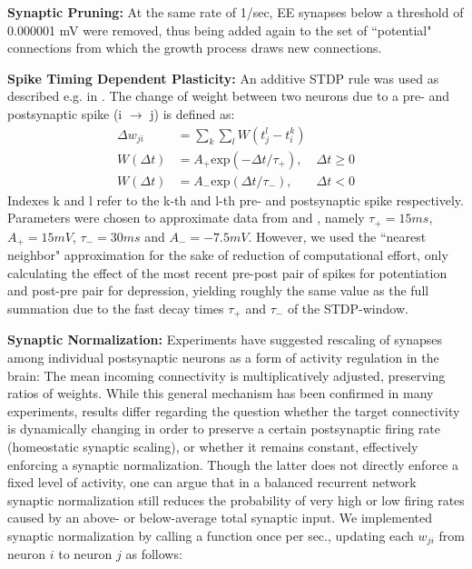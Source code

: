 \documentclass[10pt,a4paper]{article}
\begin{document}
\textbf{Synaptic Pruning:} At the same rate of 1/sec, EE synapses below a threshold of 0.000001 mV were removed, thus being added again to the set of ``potential" connections from which the growth process draws new connections.

\textbf{Spike Timing Dependent Plasticity:} An additive STDP rule was used as described e.g. in \cite{Zhang_STDP}. The change of weight between two neurons due to a pre- and postsynaptic spike (i $\rightarrow$ j) is defined as:
\begin{align}
\Delta w_{ji} &= \sum_k \sum_l W(t_j^l - t_i^k) \label{STDP_rule} \\
W(\Delta t) &= A_{+} \mathrm{exp}(-\Delta t / \tau_{+}), & \Delta t \geq 0 \label{STDP_pos} \\
W(\Delta t) &= A_{-} \mathrm{exp}(\Delta t / \tau_{-}), & \Delta t < 0 \label{STDP_neg}
\end{align}
Indexes k and l refer to the k-th and l-th pre- and postsynaptic spike respectively. Parameters were chosen to approximate data from \cite{Bi_Poo_STDP} and \cite{Froemke_STDP}, namely $\tau_{+} = 15 ms$, $A_{+} = 15 mV$, $\tau_{-} = 30 ms$ and $A_{-} = -7.5 mV$. However, we used the ``nearest neighbor" approximation for the sake of reduction of computational effort, only calculating the effect of the most recent pre-post pair of spikes for potentiation and post-pre pair for depression, yielding roughly the same value as the full summation due to the fast decay times $\tau_{+}$ and $\tau_{-}$ of the STDP-window.

\textbf{Synaptic Normalization:} Experiments have suggested rescaling of synapses among individual postsynaptic neurons as a form of activity regulation in the brain: The mean incoming connectivity is multiplicatively adjusted, preserving ratios of weights. While this general mechanism has been confirmed in many experiments, results differ regarding the question whether the target connectivity is dynamically changing in order to preserve a certain postsynaptic firing rate (homeostatic synaptic scaling), or whether it remains constant, effectively enforcing a synaptic normalization. Though the latter does not directly enforce a fixed level of activity, one can argue that in a balanced recurrent network synaptic normalization still reduces the probability of very high or low firing rates caused by an above- or below-average total synaptic input. We implemented synaptic normalization by calling a function once per sec., updating each $w_{ji}$ from neuron $i$ to neuron $j$ as follows:
\end{document}
